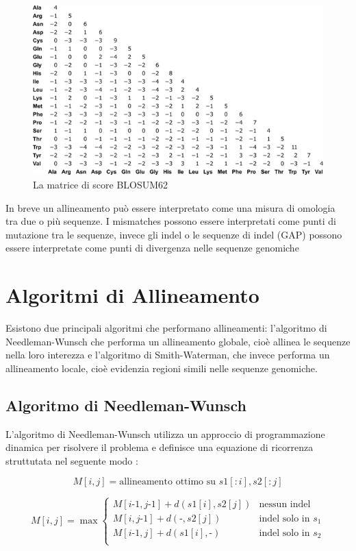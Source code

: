 \begin{figure}
    \centering
    \includegraphics[scale= 0.5]{images/BLOSUM62.png}
    \caption{La matrice di score \textsc{BLOSUM62}}
    \label{fig:blosum32}
\end{figure}

In breve un allineamento può essere interpretato come una misura di omologia tra due o più sequenze. I mismatches possono essere interpretati come punti di mutazione tra le sequenze, invece gli indel o le sequenze di indel (GAP) possono essere interpretate come punti di divergenza nelle sequenze genomiche 

\section{Algoritmi di Allineamento}
Esistono due principali algoritmi che performano allineamenti:  l'algoritmo di Needleman-Wunsch che performa un allineamento globale, cioè allinea le sequenze nella loro interezza e l'algoritmo di Smith-Waterman, che invece performa un allineamento locale, cioè evidenzia regioni simili nelle sequenze genomiche.

\subsection{Algoritmo di Needleman-Wunsch}
L'algoritmo di Needleman-Wunsch utilizza un approccio di programmazione dinamica per risolvere il problema e definisce una equazione di ricorrenza struttutata nel seguente modo : 

\begin{equation*}
    M[i, j] = \textrm{allineamento  ottimo  su }  s1[:i],  s2[:j]
\end{equation*}

\begin{equation}
    M[i, j] = \max  {
                    \begin{cases} 
                        M[i \textrm{-} 1,j \textrm{-} 1] +d(s1[i],s2[j]) & \textrm{nessun indel}\\
                        M[i,j \textrm{-} 1] +d(\textrm{-},s2[j]) & \textrm{indel solo in } s_1\\
                        M[i \textrm{-} 1,j] +d(s1[i],\textrm{-}) & \textrm{indel solo in } s_2\\
                    \end{cases}
                    }
\end{equation}

